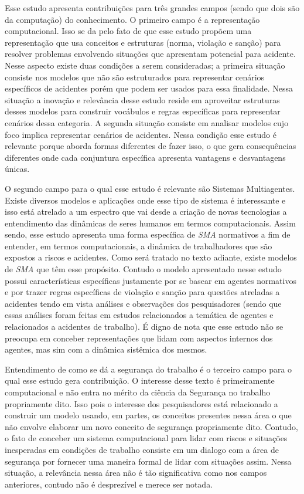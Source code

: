 Esse estudo apresenta contribuições para três grandes campos (sendo que dois são da computação) do conhecimento. O primeiro campo é a representação computacional. Isso se da pelo fato de que esse estudo propõem uma representação que usa conceitos e estruturas (norma, violação e sanção) para resolver problemas envolvendo situações que apresentam potencial para acidente. Nesse aspecto existe duas condições a serem consideradas; a primeira situação consiste nos modelos que não são estruturados para representar cenários específicos de acidentes porém que podem ser usados para essa finalidade. Nessa situação a inovação e relevância desse estudo reside em aproveitar estruturas desses modelos para construir vocábulos e regras específicas para representar cenários dessa categoria. A segunda situação consiste em analisar modelos cujo foco implica representar cenários de acidentes. Nessa condição esse estudo é relevante porque aborda formas diferentes de fazer isso, o que gera consequências diferentes onde cada conjuntura específica apresenta vantagens e desvantagens únicas.    

O segundo campo para o qual esse estudo é relevante são Sistemas Multiagentes. Existe diversos modelos e aplicações onde esse tipo de sistema é interessante e isso está atrelado a um espectro que vai desde a criação de novas tecnologias a entendimento das dinâmicas de seres humanos em termos computacionais. Assim sendo, esse estudo apresenta uma forma específica de \textit{SMA} normativos a fim de entender, em termos computacionais, a dinâmica de trabalhadores que são expostos a riscos e acidentes. Como será tratado no texto adiante, existe modelos de \textit{SMA} que têm esse propósito. Contudo o modelo apresentado nesse estudo possui características específicas justamente por se basear em agentes normativos e por trazer regras específicas de violação e sanção para questões atreladas a acidentes tendo em vista análises e observações dos pesquisadores (sendo que essas análises foram feitas em estudos relacionados a temática de agentes e relacionados a acidentes de trabalho). É digno de nota que esse estudo não se preocupa em conceber representações que lidam com aspectos internos dos agentes, mas sim com a dinâmica sistêmica dos mesmos.

Entendimento de como se dá a segurança do trabalho é o terceiro campo para o qual esse estudo gera contribuição. O interesse desse texto é primeiramente computacional e não entra no mérito da ciência da Segurança no trabalho propriamente dito. Isso pois o interesse dos pesquisadores está relacionado a construir um modelo usando, em partes, os conceitos presentes nessa área o que não envolve elaborar um novo conceito de segurança propriamente dito. Contudo, o fato de conceber um sistema computacional para lidar com riscos e situações inesperadas em condições de trabalho consiste em um dialogo com a área de segurança por fornecer uma maneira formal de lidar com situações assim. Nessa situação, a relevância nessa área não é tão significativa como nos campos anteriores, contudo não é desprezível e merece ser notada.